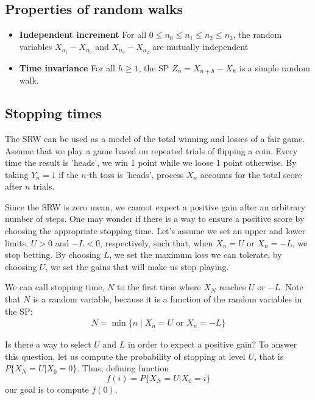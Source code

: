 \subsection{Properties of random walks}

\begin{itemize}
\item \textbf{Independent increment} For all $0 \le n_0 \le n_1 \le n_2 \le n_3$, the random variables $X_{n_1} - X_{n_0}$ and $X_{n_3} - X_{n_2}$ are mutually independent
\item \textbf{Time invariance} For all $h \ge 1$, the SP $Z_n = X_{n+h} - X_h$ is a simple random walk.
\end{itemize}

\subsection{Stopping times}

The SRW can be used as a model of the total winning and losses of a fair game. Assume that we play a game based on repeated trials of flipping a coin. Every time the result is 'heads', we win 1 point while we loose 1 point otherwise. By taking $Y_n=1$ if the $n$-th toss is 'heads', process $X_n$ accounts for the total score after $n$ trials.

Since the SRW is zero mean, we cannot expect a positive gain after an arbitrary number of steps. One may wonder if there is a way to ensure a positive score by choosing the appropriate stopping time. Let's assume we set an upper and lower limits, $U>0$ and $-L<0$, respectively, such that, when $X_n=U$ or $X_n=-L$, we stop betting. By choosing $L$, we set the maximum loss we can tolerate, by choosing $U$, we set the gains that will make us stop playing.

We can call stopping time, $N$ to the first time where $X_N$ reaches $U$ or $-L$. Note that $N$ is a random variable, because it is a function of the random variables in the SP:
\begin{align}
N = \min\{n \mid X_n = U \text{ or } X_n = -L \} 
\end{align}

Is there a way to select $U$ and $L$ in order to expect a positive gain? To answer this question, let us compute the probability of stopping at level $U$, that is $P\{X_N=U|X_0=0\}$. Thus, defining function
$$
f(i) = P\{X_N = U | X_0 = i\}
$$
our goal is to compute $f(0)$. 

